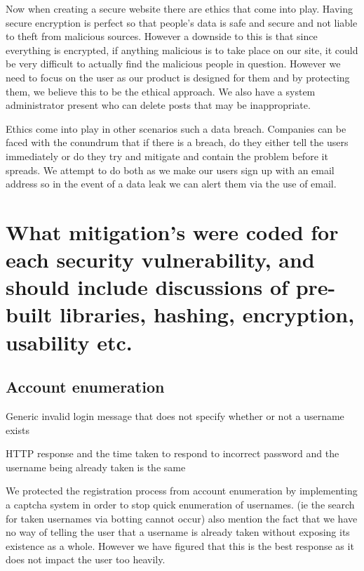 \documentclass{ueacmpstyle}
\begin{document}
        Now when creating a secure website there are ethics that come into play. Having secure encryption is perfect so that people's data is safe and secure and not liable to theft from malicious sources. However a downside to this is that since everything is encrypted, if anything malicious is to take place on our site, it could be very difficult to actually find the malicious people in question. However we need to focus on the user as our product is designed for them and by protecting them, we believe this to be the ethical approach.  We also have a system administrator present who can delete posts that may be inappropriate.

        Ethics come into play in other scenarios such a data breach. Companies can be faced with the conundrum that if there is a breach, do they either tell the users immediately or do they try and mitigate and contain the problem before it spreads. We attempt to do both as we make our users sign up with an email address so in the event of a data leak we can alert them via the use of email.
         

    
    \section{What mitigation's were coded for each security vulnerability, and should include
    discussions of pre-built libraries, hashing, encryption, usability etc.}
    
        \subsection{Account enumeration}

        Generic invalid login message that does not specify whether or not a username exists
        
        HTTP response and the time taken to respond to incorrect password and the username being already taken is the same
        
        We protected the registration process from account enumeration by implementing a captcha system in order to stop quick enumeration of usernames. (ie the search for taken usernames via botting cannot occur) also mention the fact that we have no way of telling the user that a username is already taken without exposing its existence as a whole. However we have figured that this is the best response as it does not impact the user too heavily.
        
\end{document}

